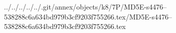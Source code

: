 ../../../../../.git/annex/objects/k8/7P/MD5E-s4476--538288c6a634bd979b3cf9203f755266.tex/MD5E-s4476--538288c6a634bd979b3cf9203f755266.tex